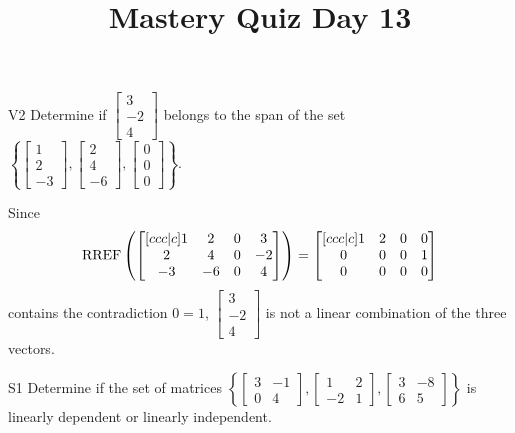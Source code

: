 \documentclass{sbgLAquiz}
\title{Mastery Quiz Day 13 }
\begin{document}
\begin{problem}{V2}
  Determine if
  \(\begin{bmatrix} 3 \\ -2 \\ 4 \end{bmatrix}\)
  belongs to the span of the set
  \(\left\{
    \begin{bmatrix} 1 \\ 2 \\ -3 \end{bmatrix},
    \begin{bmatrix} 2 \\ 4 \\ -6 \end{bmatrix},
    \begin{bmatrix} 0 \\ 0 \\ 0 \end{bmatrix}
    \right\}
  \).
\end{problem}
\begin{solution}
  Since
  \[
    \operatorname{RREF}\left(
      \begin{bmatrix}[ccc|c]
        1 & 2 & 0 & 3 \\
        2 & 4 & 0 & -2 \\
        -3 & -6 & 0 & 4
      \end{bmatrix}
    \right) =
    \begin{bmatrix}[ccc|c]
      1 & 2 & 0 & 0 \\
      0 & 0 & 0 & 1 \\
      0 & 0 & 0 & 0
    \end{bmatrix}
  \]
  contains the contradiction \(0=1\),
  \(\begin{bmatrix} 3 \\ -2 \\ 4 \end{bmatrix}\) is
  not a linear combination of the three vectors.
\end{solution}
\begin{problem}{S1} 
Determine if the set of matrices $\left\{\begin{bmatrix} 3 & -1 \\ 0 & 4 \end{bmatrix}, \begin{bmatrix} 1  & 2 \\ -2 & 1 \end{bmatrix}, \begin{bmatrix} 3 & -8 \\ 6 & 5 \end{bmatrix} \right\}$  is linearly dependent or linearly independent.
\end{problem}
\end{document}
